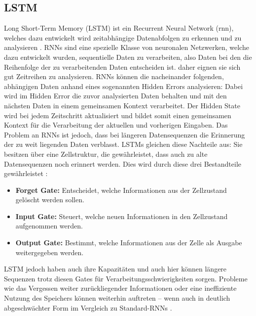 \documentclass[a4paper,12pt]{article}
\begin{document}
	\subsection{LSTM}
	Long Short-Term Memory (LSTM) ist ein Recurrent Neural Network (\gls{rnn}), welches dazu entwickelt wird zeitabhängige Datenabfolgen zu erkennen und zu analysieren \cite{staudemeyer2019understanding}.
	RNNs sind eine spezielle Klasse von neuronalen Netzwerken, welche dazu entwickelt wurden, sequentielle Daten zu verarbeiten, also Daten bei den die Reihenfolge der zu verarbeitenden Daten entscheiden ist. daher eignen sie sich gut Zeitreihen zu analysieren. RNNs können die nacheinander folgenden, abhängigen Daten anhand eines sogenannten Hidden Errors analysieren: Dabei wird im Hidden Error die zuvor analysierten Daten behalten und mit den nächsten Daten in einem gemeinsamen Kontext verarbeitet. Der Hidden State wird bei jedem Zeitschritt aktualisiert und bildet somit einen gemeinsamen Kontext für die Verarbeitung der aktuellen und vorherigen Eingaben.
	Das Problem an RNNs ist jedoch, dass bei längeren Datensequenzen die Erinnerung der zu weit liegenden Daten verblasst.
	LSTMs gleichen diese Nachteile aus: Sie besitzen über eine Zellstruktur, die gewährleistet, dass auch zu alte Datensequenzen noch erinnert werden.
	Dies wird durch diese drei Bestandteile gewährleistet \cite{hochreiter1997long}:
	\begin{itemize}
		\item \textbf{Forget Gate:} Entscheidet, welche Informationen aus der Zellzustand gelöscht werden sollen.
		\item \textbf{Input Gate:}  Steuert, welche neuen Informationen in den Zellzustand aufgenommen werden.
		\item \textbf{Output Gate:} Bestimmt, welche Informationen aus der Zelle als Ausgabe weitergegeben werden.
	\end{itemize}
	LSTM jedoch haben auch ihre Kapazitäten und auch hier können längere Sequenzen trotz diesen Gates für Verarbeitungsschwierigkeiten sorgen.
	Probleme wie das Vergessen weiter zurückliegender Informationen oder eine ineffiziente Nutzung des Speichers können weiterhin auftreten – wenn auch in deutlich abgeschwächter Form im Vergleich zu Standard-RNNs \cite{hochreiter1997long}.
	
\end{document}
